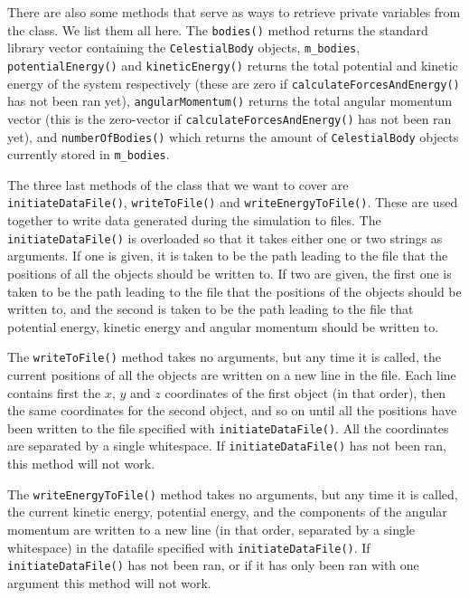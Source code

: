 \documentclass[reprint,english,notitlepage]{revtex4-1}  %
\begin{document}
There are also some methods that serve as ways to retrieve private variables from the class. We list them all here. The \verb+bodies()+ method returns the standard library vector containing the \verb+CelestialBody+ objects, \verb+m_bodies+, \verb+potentialEnergy()+ and \verb+kineticEnergy()+ returns the total potential and kinetic energy of the system respectively (these are zero if \verb+calculateForcesAndEnergy()+ has not been ran yet), \verb+angularMomentum()+ returns the total angular momentum vector (this is the zero-vector if \verb+calculateForcesAndEnergy()+ has not been ran yet), and \verb+numberOfBodies()+ which returns the amount of \verb+CelestialBody+ objects currently stored in \verb+m_bodies+.

The three last methods of the class that we want to cover are \verb+initiateDataFile()+, \verb+writeToFile()+ and \verb+writeEnergyToFile()+. These are used together to write data generated during the simulation to files. The \verb+initiateDataFile()+ is overloaded so that it takes either one or two strings as arguments. If one is given, it is taken to be the path leading to the file that the positions of all the objects should be written to. If two are given, the first one is taken to be the path leading to the file that the positions of the objects should be written to, and the second is taken to be the path leading to the file that potential energy, kinetic energy and angular momentum should be written to. \newline

\label{poi:write_to_file}
The \verb+writeToFile()+ method takes no arguments, but any time it is called, the current positions of all the objects are written on a new line in the file. Each line contains first the $x$, $y$ and $z$ coordinates of the first object (in that order), then the same coordinates for the second object, and so on until all the positions have been written to the file specified with \verb+initiateDataFile()+. All the coordinates are separated by a single whitespace. If \verb+initiateDataFile()+ has not been ran, this method will not work. \newline

\label{poi:write_energy_to_file}
The \verb+writeEnergyToFile()+ method takes no arguments, but any time it is called, the current kinetic energy, potential energy, and the components of the angular momentum are written to a new line (in that order, separated by a single whitespace) in the datafile specified with \verb+initiateDataFile()+. If \verb+initiateDataFile()+ has not been ran, or if it has only been ran with one argument this method will not work.
\end{document}
